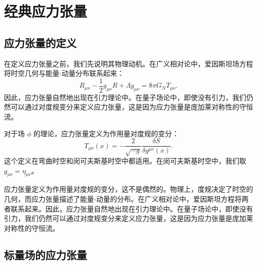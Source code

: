 \section{经典应力张量}

\subsection{应力张量的定义}

在定义应力张量之前，我们先说明其物理动机。在广义相对论中，爱因斯坦场方程将时空几何与能量-动量分布联系起来：
\begin{equation}
    R_{\mu\nu} - \frac{1}{2} g_{\mu\nu} R + \Lambda g_{\mu\nu} = 8\pi G_N T_{\mu\nu}.
\end{equation}
因此，应力张量自然地出现在引力理论中。在量子场论中，即使没有引力，我们仍然可以通过对度规变分来定义应力张量，这是因为应力张量是庞加莱对称性的守恒流。

\begin{definition}[应力张量]
对于场 $\phi$ 的理论，应力张量定义为作用量对度规的变分：
\begin{equation}
    T_{\mu\nu}(x) = -\frac{2}{\sqrt{-g}} \frac{\delta S}{\delta g^{\mu\nu}(x)}.
\end{equation}
这个定义在弯曲时空和闵可夫斯基时空中都适用。在闵可夫斯基时空中，我们取 $g_{\mu\nu} = \eta_{\mu\nu}$。
\end{definition}

\begin{note}[为什么是对度规变分？]
应力张量定义为作用量对度规的变分，这不是偶然的。物理上，度规决定了时空的几何，而应力张量描述了能量-动量的分布。在广义相对论中，爱因斯坦方程将两者联系起来。因此，应力张量自然地出现在引力理论中。在量子场论中，即使没有引力，我们仍然可以通过对度规变分来定义应力张量，这是因为应力张量是庞加莱对称性的守恒流。
\end{note}

\subsection{标量场的应力张量}

